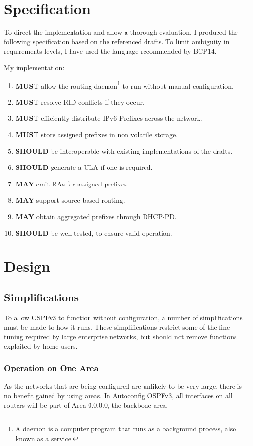 \chapter{Specification}
To direct the implementation and allow a thorough evaluation, I produced the
following specification based on the referenced drafts. To limit
ambiguity in requirements levels, I have used the language recommended by BCP14.
\cite{rfc2119}

My implementation:
\begin{enumerate}
      \item \textbf{MUST} allow the routing daemon\footnote{A daemon is a computer
      program that runs as a background process, also known as a service.} to run
      without manual configuration.
      \item \textbf{MUST} resolve RID conflicts if they occur.
      \item \textbf{MUST} efficiently distribute IPv6 Prefixes across the network.
      \item \textbf{MUST} store assigned prefixes in non volatile storage.
      \item \textbf{SHOULD} be interoperable with existing implementations of the drafts.
      \item \textbf{SHOULD} generate a ULA if one is required.
      \item \textbf{MAY} emit RAs for assigned prefixes.
      \item \textbf{MAY} support source based routing.
      \item \textbf{MAY} obtain aggregated prefixes through DHCP-PD. 
      \item \textbf{SHOULD} be well tested, to ensure valid operation.
\end{enumerate}

\chapter{Design}
\section{Simplifications}
To allow OSPFv3 to function without configuration, a number of simplifications
must be made to how it runs. These simplifications restrict some of the fine
tuning required by large enterprise networks, but should not remove functions
exploited by home users. 

\subsection{Operation on One Area}
As the networks that are being configured are unlikely to be very large, there
is no benefit gained by using areas. In Autoconfig OSPFv3, all
interfaces on all routers will be part of Area 0.0.0.0, the backbone area.

